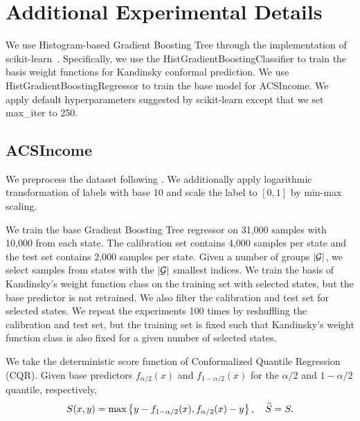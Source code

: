 \section{Additional Experimental Details}
We use Histogram-based Gradient Boosting Tree through the implementation of scikit-learn~\citep{Pedregos11}. Specifically, we use the HistGradientBoostingClassifier to train the basis weight functions for Kandinsky conformal prediction. We use HistGradientBoostingRegressor to train the base model for ACSIncome. We apply default hyperparameters suggested by scikit-learn except that we set max\_iter to 250.

\subsection{ACSIncome}
\label{subsec:app_acs}
We preprocess the dataset following \citet{LW0N23}. We additionally apply logarithmic transformation of labels with base 10 and scale the label to $[0,1]$ by min-max scaling.

We train the base Gradient Boosting Tree regressor on 31,000 samples with 10,000 from each state. The calibration set contains 4,000 samples per state and the test set contains 2,000 samples per state. Given a number of groups $|{\cal G}|$, we select samples from states with the $|{\cal G}|$ smallest indices. We train the basis of Kandinsky's weight function class on the training set with selected states, but the base predictor is not retrained. We also filter the calibration and test set for selected states. We repeat the experiments 100 times by reshuffling the calibration and test set, but the training set is fixed such that Kandinsky's weight function class is also fixed for a given number of selected states.

We take the deterministic score function of Conformalized Quantile Regression (CQR). Given base predictors $f_{\alpha/2}(x)$ and $f_{1-\alpha/2}(x)$ for the $\alpha/2$ and $1-\alpha/2$ quantile, respectively,
\begin{align*}
    S(x,y) = \max \left\{  y-f_{1-\alpha/2}(x),  f_{\alpha/2}(x) - y \right\}, \quad {\widetilde{S}} = S. 
\end{align*}

